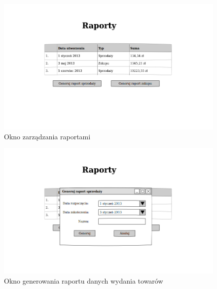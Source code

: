 \begin{figure}[!htb]
  \begin{center}
    \includegraphics[scale=0.45]{../img/interfejs/zarzadzanie-raportami.png}
  \end{center}
  \caption{Okno zarządzania raportami}
\end{figure}
\FloatBarrier

\begin{figure}[!htb]
  \begin{center}
    \includegraphics[scale=0.45]{../img/interfejs/generowanie-raportu-sprzedazy.png}
  \end{center}
  \caption{Okno generowania raportu danych wydania towarów}
\end{figure}
\FloatBarrier

